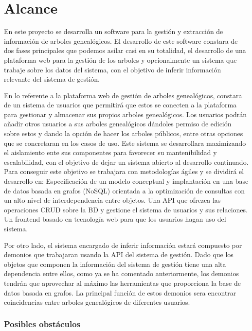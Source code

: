 \documentclass[12pt]{article} %
\begin{document}
\newpage
\section{Alcance} 
En este proyecto se desarrolla un software para la gestión y extracción de información de arboles genealógicos. El desarrollo de este software constara de dos fases principales que podemos asilar casi en su totalidad, el desarrollo de una plataforma web para la gestión de los arboles y opcionalmente un sistema que trabaje sobre los datos del sistema, con el objetivo de inferir información relevante del sistema de gestión. 

En lo referente a la plataforma web de gestión de arboles genealógicos, constara de un sistema de usuarios que permitirá que estos se conecten a la plataforma para gestionar y almacenar sus propios arboles genealógicos. Los usuarios podrán añadir otros usuarios a sus arboles genealógicos dándoles permiso de edición sobre estos y dando la opción de hacer los arboles públicos, entre otras opciones que se concretaran en los casos de uso.
Este sistema se desarrollara maximizando el aislamiento ente sus componentes para favorecer su mantenibilidad y escalabilidad, con el objetivo de dejar un sistema abierto al desarrollo continuado. Para conseguir este objetivo se trabajara con metodologías ágiles y se dividirá el desarrollo en:
Especificación de un modelo conceptual y implantación en una base de datos basada en grafos (NoSQL) orientada a la optimización de consultas con un alto nivel de interdependencia entre objetos.
Una API que ofrezca las operaciones CRUD sobre la BD y gestione el sistema de usuarios y sus relaciones.
Un frontend basado en tecnología web para que los usuarios hagan uso del sistema.

Por otro lado, el sistema encargado de inferir información estará compuesto por demonios que trabajaran usando la API del sistema de gestión. Dado que los objetos que componen la información  del sistema de gestión tiene una alta dependencia entre ellos, como ya se ha comentado anteriormente, los demonios tendrán que aprovechar al máximo las herramientas que proporciona la base de datos basada en grafos. La principal función de estos demonios sera encontrar coincidencias entre arboles genealógicos de diferentes usuarios.

\subsubsection{Posibles obstáculos}
\end{document}
